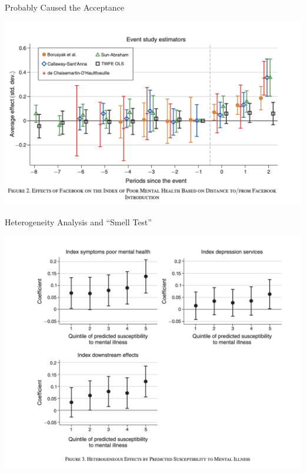 \documentclass{beamer}
\begin{document}
\begin{frame}{Probably Caused the Acceptance}
\begin{center}
\includegraphics[scale=0.35]{./lecture_includes/facebook_3}
\end{center}
\end{frame}

\begin{frame}{Heterogeneity Analysis and ``Smell Test''}
\begin{center}
\includegraphics[scale=0.35]{./lecture_includes/facebook_4}
\end{center}
\end{frame}
\end{document}
